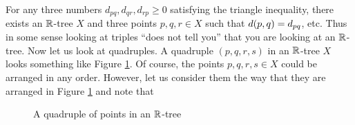 
For any three numbers $d_{pq},d_{qr},d_{rp}\geq 0$ satisfying the triangle inequality, there exists an $\R$-tree $X$ and three points $p,q,r\in X$ such that $d(p,q) = d_{pq}$, etc. Thus in some sense looking at triples ``does not tell you'' that you are looking at an $\R$-tree. Now let us look at quadruples. A quadruple $(p,q,r,s)$ in an $\R$-tree $X$ looks something like Figure \ref{figurequadruple}. Of course, the points $p,q,r,s\in X$ could be arranged in any order. However, let us consider them the way that they are arranged in Figure \ref{figurequadruple} and note that


\begin{figure}
\begin{center}
\caption{A quadruple of points in an $\R$-tree}
\label{figurequadruple}
\end{center}
\end{figure}


